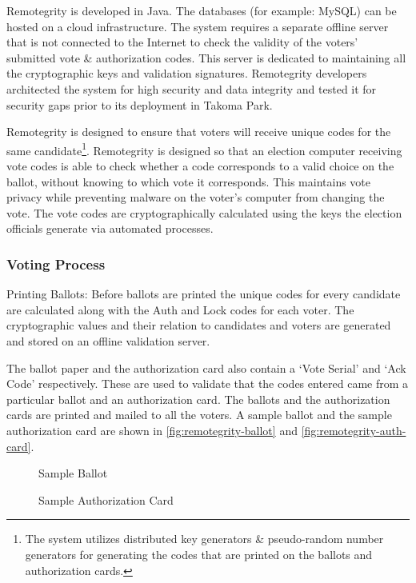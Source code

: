 Remotegrity is developed in Java. The databases (for example: MySQL)
can be hosted on a cloud infrastructure. The system requires a
separate offline server that is not connected to the Internet to check
the validity of the voters' submitted vote \& authorization
codes. This server is dedicated to maintaining all the cryptographic
keys and validation signatures. Remotegrity developers architected the
system for high security and data integrity and tested it for security
gaps prior to its deployment in Takoma Park.

Remotegrity is designed to ensure that voters will receive unique
codes for the same candidate\footnote{The system utilizes distributed
  key generators \& pseudo-random number generators for generating the
  codes that are printed on the ballots and authorization
  cards.}. Remotegrity is designed so that an election computer
receiving vote codes is able to check whether a code corresponds to a
valid choice on the ballot, without knowing to which vote it
corresponds. This maintains vote privacy while preventing malware on
the voter's computer from changing the vote. The vote codes are
cryptographically calculated using the keys the election officials
generate via automated processes.

\subsubsection{Voting Process}

Printing Ballots: Before ballots are printed the unique codes for
every candidate are calculated along with the Auth and Lock codes for
each voter. The cryptographic values and their relation to candidates
and voters are generated and stored on an offline validation server.

The ballot paper and the authorization card also contain a `Vote
Serial' and `Ack Code' respectively. These are used to validate that
the codes entered came from a particular ballot and an authorization
card. The ballots and the authorization cards are printed and mailed
to all the voters. A sample ballot and the sample authorization card
are shown in \autoref{fig:remotegrity-ballot} and
\autoref{fig:remotegrity-auth-card}.

\begin{figure}
  \centering {}
  \caption{Sample Ballot}
  \label{fig:remotegrity-ballot}
\end{figure}

\begin{figure}
  \centering {}
  \caption{Sample Authorization Card}
  \label{fig:remotegrity-auth-card}
\end{figure}


